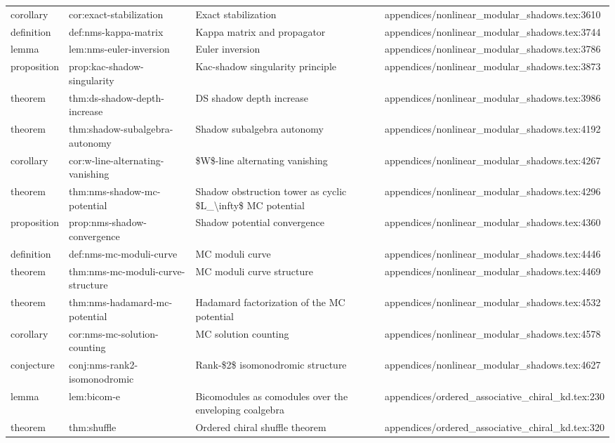 \documentclass[11pt]{article}
\begin{document}
\begin{longtable}{L{0.10\textwidth}L{0.26\textwidth}L{0.42\textwidth}L{0.22\textwidth}}
corollary & cor:exact-stabilization & Exact stabilization & appendices/nonlinear\_modular\_shadows.tex:3610\\
definition & def:nms-kappa-matrix & Kappa matrix and propagator & appendices/nonlinear\_modular\_shadows.tex:3744\\
lemma & lem:nms-euler-inversion & Euler inversion & appendices/nonlinear\_modular\_shadows.tex:3786\\
proposition & prop:kac-shadow-singularity & Kac-shadow singularity principle & appendices/nonlinear\_modular\_shadows.tex:3873\\
theorem & thm:ds-shadow-depth-increase & DS shadow depth increase & appendices/nonlinear\_modular\_shadows.tex:3986\\
theorem & thm:shadow-subalgebra-autonomy & Shadow subalgebra autonomy & appendices/nonlinear\_modular\_shadows.tex:4192\\
corollary & cor:w-line-alternating-vanishing & \$W\$-line alternating vanishing & appendices/nonlinear\_modular\_shadows.tex:4267\\
theorem & thm:nms-shadow-mc-potential & Shadow obstruction tower as cyclic \$L\_\textbackslash{}infty\$ MC potential & appendices/nonlinear\_modular\_shadows.tex:4296\\
proposition & prop:nms-shadow-convergence & Shadow potential convergence & appendices/nonlinear\_modular\_shadows.tex:4360\\
definition & def:nms-mc-moduli-curve & MC moduli curve & appendices/nonlinear\_modular\_shadows.tex:4446\\
theorem & thm:nms-mc-moduli-curve-structure & MC moduli curve structure & appendices/nonlinear\_modular\_shadows.tex:4469\\
theorem & thm:nms-hadamard-mc-potential & Hadamard factorization of the MC potential & appendices/nonlinear\_modular\_shadows.tex:4532\\
corollary & cor:nms-mc-solution-counting & MC solution counting & appendices/nonlinear\_modular\_shadows.tex:4578\\
conjecture & conj:nms-rank2-isomonodromic & Rank-\$2\$ isomonodromic structure & appendices/nonlinear\_modular\_shadows.tex:4627\\
lemma & lem:bicom-e & Bicomodules as comodules over the enveloping coalgebra & appendices/ordered\_associative\_chiral\_kd.tex:230\\
theorem & thm:shuffle & Ordered chiral shuffle theorem & appendices/ordered\_associative\_chiral\_kd.tex:320\\

\end{longtable}
\end{document}
